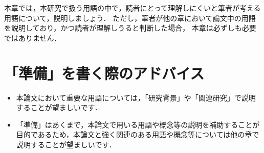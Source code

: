 本章では，本研究で扱う用語の中で，読者にとって理解しにくいと筆者が考える用語について，説明しましょう．
ただし，筆者が他の章において論文中の用語を説明しており，かつ読者が理解しうると判断した場合，
本章は必ずしも必要ではありません．

\section{「準備」を書く際のアドバイス}
\begin{itemize}
    \item 本論文において重要な用語については，「研究背景」や「関連研究」で説明することが望ましいです．
    \item 「準備」はあくまで，本論文で用いる用語や概念等の説明を補助することが目的であるため，本論文と強く関連のある用語や概念等については他の章で説明することが望ましいです．
\end{itemize}